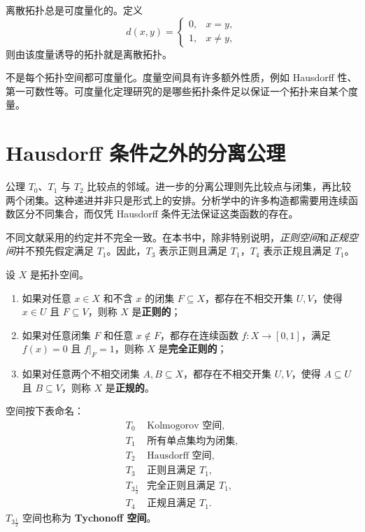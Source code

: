 \begin{example}
离散拓扑总是可度量化的。定义
\[
    d(x,y)=
    \begin{cases}
    0,&x=y,\\
    1,&x\ne y,
    \end{cases}
\]
则由该度量诱导的拓扑就是离散拓扑。
\end{example}

\begin{remark}
不是每个拓扑空间都可度量化。度量空间具有许多额外性质，例如 Hausdorff 性、第一可数性等。可度量化定理研究的是哪些拓扑条件足以保证一个拓扑来自某个度量。
\end{remark}

\section{Hausdorff 条件之外的分离公理}

公理 $T_0$、$T_1$ 与 $T_2$ 比较点的邻域。进一步的分离公理则先比较点与闭集，再比较两个闭集。这种递进并非只是形式上的安排。分析学中的许多构造都需要用连续函数区分不同集合，而仅凭 Hausdorff 条件无法保证这类函数的存在。

不同文献采用的约定并不完全一致。在本书中，除非特别说明，\emph{正则空间}和\emph{正规空间}并不预先假定满足 $T_1$。因此，$T_3$ 表示正则且满足 $T_1$，$T_4$ 表示正规且满足 $T_1$。

\begin{definition}[正则性与正规性]
设 $X$ 是拓扑空间。
\begin{enumerate}
    \item 如果对任意 $x\in X$ 和不含 $x$ 的闭集 $F\subseteq X$，都存在不相交开集 $U,V$，使得 $x\in U$ 且 $F\subseteq V$，则称 $X$ 是\textbf{正则的}；
    \item 如果对任意闭集 $F$ 和任意 $x\notin F$，都存在连续函数 $f:X\to[0,1]$，满足 $f(x)=0$ 且 $f|_F=1$，则称 $X$ 是\textbf{完全正则的}；
    \item 如果对任意两个不相交闭集 $A,B\subseteq X$，都存在不相交开集 $U,V$，使得 $A\subseteq U$ 且 $B\subseteq V$，则称 $X$ 是\textbf{正规的}。
\end{enumerate}
\end{definition}

\begin{definition}[分离公理的层级]
空间按下表命名：
\[
\begin{array}{c|l}
T_0 & \text{Kolmogorov 空间},\\
T_1 & \text{所有单点集均为闭集},\\
T_2 & \text{Hausdorff 空间},\\
T_3 & \text{正则且满足 }T_1,\\
T_{3\frac12} & \text{完全正则且满足 }T_1,\\
T_4 & \text{正规且满足 }T_1.
\end{array}
\]
$T_{3\frac12}$ 空间也称为 \textbf{Tychonoff 空间}。
\end{definition}

